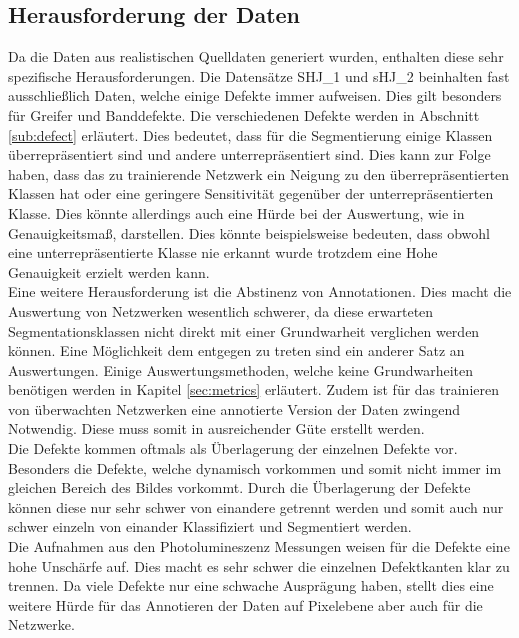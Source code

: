   \subsection{Herausforderung der Daten}
  Da die Daten aus realistischen Quelldaten generiert wurden, enthalten diese sehr spezifische Herausforderungen.
  Die Datensätze SHJ\_1 und sHJ\_2 beinhalten fast ausschließlich Daten, welche einige Defekte immer aufweisen. Dies gilt besonders für Greifer und Banddefekte. Die verschiedenen Defekte werden in Abschnitt \ref{sub:defect} erläutert. Dies bedeutet, dass für die Segmentierung einige Klassen überrepräsentiert sind und andere unterrepräsentiert sind. Dies kann zur Folge haben, dass das zu trainierende Netzwerk ein Neigung zu den überrepräsentierten Klassen hat oder eine geringere Sensitivität gegenüber der unterrepräsentierten Klasse. Dies könnte allerdings auch eine Hürde bei der Auswertung, wie in Genauigkeitsmaß, darstellen. Dies könnte beispielsweise bedeuten, dass obwohl eine unterrepräsentierte Klasse nie erkannt wurde trotzdem eine Hohe Genauigkeit erzielt werden kann. \\
  Eine weitere Herausforderung ist die Abstinenz von Annotationen. Dies macht die Auswertung von Netzwerken wesentlich schwerer, da diese erwarteten Segmentationsklassen nicht direkt mit einer Grundwarheit verglichen werden können. Eine Möglichkeit dem entgegen zu treten sind ein anderer Satz an Auswertungen. Einige Auswertungsmethoden, welche keine Grundwarheiten benötigen werden in Kapitel \ref{sec:metrics} erläutert. Zudem ist für das trainieren von überwachten Netzwerken eine annotierte Version der Daten zwingend Notwendig. Diese muss somit in ausreichender Güte erstellt werden.\\ 
  Die Defekte kommen oftmals als Überlagerung der einzelnen Defekte vor. Besonders die Defekte, welche dynamisch vorkommen und somit nicht immer im gleichen Bereich des Bildes vorkommt. Durch die Überlagerung der Defekte können diese nur sehr schwer von einandere getrennt werden und somit auch nur schwer einzeln von einander Klassifiziert und Segmentiert werden. \\
  Die Aufnahmen aus den Photolumineszenz Messungen weisen für die Defekte eine hohe Unschärfe auf. Dies macht es sehr schwer die einzelnen Defektkanten klar zu trennen. Da viele Defekte nur eine schwache Ausprägung haben, stellt dies eine weitere Hürde für das Annotieren der Daten auf Pixelebene aber auch für die Netzwerke. 
  
